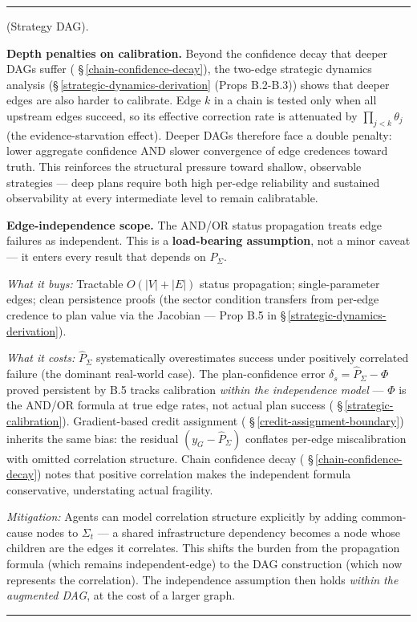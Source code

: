 \documentclass[11pt,oneside]{article}
\newcounter{claim}[section]
\renewcommand{\theclaim}{\thesection.\arabic{claim}}
\newenvironment{segment}[2]{%
  \refstepcounter{claim}%
  \bigskip\noindent\hrule\smallskip
  \noindent{\bfseries #1~\theclaim}\enskip(#2).\par\smallskip
  \noindent\ignorespaces
}{%
  \par\smallskip\noindent\hrule\bigskip
}
\newenvironment{definition}[1][]{\begin{segment}{Definition}{#1}}{\end{segment}}
\begin{document}
\begin{definition}[Strategy DAG]
\textbf{Depth penalties on calibration.} Beyond the confidence decay that deeper DAGs suffer ( \S\,\ref{chain-confidence-decay}), the two-edge strategic dynamics analysis (\S\,\ref{strategic-dynamics-derivation} (Props B.2-B.3)) shows that deeper edges are also harder to calibrate. Edge $k$ in a chain is tested only when all upstream edges succeed, so its effective correction rate is attenuated by $\prod_{j<k}\theta_j$ (the evidence-starvation effect). Deeper DAGs therefore face a double penalty: lower aggregate confidence AND slower convergence of edge credences toward truth. This reinforces the structural pressure toward shallow, observable strategies — deep plans require both high per-edge reliability and sustained observability at every intermediate level to remain calibratable.

\textbf{Edge-independence scope.} The AND/OR status propagation treats edge failures as independent. This is a \textbf{load-bearing assumption}, not a minor caveat — it enters every result that depends on $\hat P_\Sigma$.

\textit{What it buys:} Tractable $O(\lvert V\rvert + \lvert E\rvert)$ status propagation; single-parameter edges; clean persistence proofs (the sector condition transfers from per-edge credence to plan value via the Jacobian — Prop B.5 in \S\,\ref{strategic-dynamics-derivation}).

\textit{What it costs:} $\hat P_\Sigma$ systematically overestimates success under positively correlated failure (the dominant real-world case). The plan-confidence error $\delta_s = \hat P_\Sigma - \Phi$ proved persistent by B.5 tracks calibration \textit{within the independence model} — $\Phi$ is the AND/OR formula at true edge rates, not actual plan success ( \S\,\ref{strategic-calibration}). Gradient-based credit assignment ( \S\,\ref{credit-assignment-boundary}) inherits the same bias: the residual $(y_G - \hat P_\Sigma)$ conflates per-edge miscalibration with omitted correlation structure. Chain confidence decay ( \S\,\ref{chain-confidence-decay}) notes that positive correlation makes the independent formula conservative, understating actual fragility.

\textit{Mitigation:} Agents can model correlation structure explicitly by adding common-cause nodes to $\Sigma_t$ — a shared infrastructure dependency becomes a node whose children are the edges it correlates. This shifts the burden from the propagation formula (which remains independent-edge) to the DAG construction (which now represents the correlation). The independence assumption then holds \textit{within the augmented DAG}, at the cost of a larger graph.

\end{definition}
\end{document}
